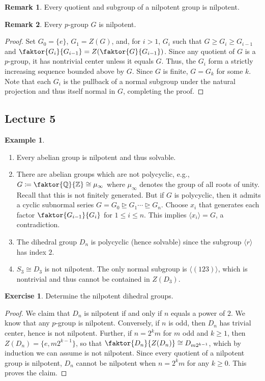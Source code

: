 \documentclass[10pt,letterpaper,cm]{nupset}
\theoremstyle{definition}
\newtheorem{exmp}{Example}
\newtheorem{remark}{Remark}
\newtheorem{exercise}{Exercise}
\newcommand{\Q}{\mathbb Q}
\newcommand{\Z}{\mathbb Z}
\newcommand{\1}{\mathbf{1}}
\newcommand{\0}{\vec 0}
\begin{document}
\begin{remark}
Every quotient and subgroup of a nilpotent group is nilpotent. 
\end{remark}

\begin{remark}
Every $p$-group $G$ is nilpotent. 
\end{remark}
\begin{proof}
Set $G_0 = \{e\}$, $G_1 = Z(G)$, and, for $i>1$, $G_{i}$ such that $G \geq G_i \geq G_{i-1}$ and $\faktor{G_i}{G_{i-1}} = Z(\faktor{G}{G_{i-1}})$. Since any quotient of $G$ is a $p$-group, it has nontrivial center unless it equals $G$.  Thus, the $G_i$ form a strictly increasing sequence bounded above by $G$. Since $G$ is finite, $G = G_k$ for some $k$. Note that each $G_i$ is the pullback of a normal subgroup under the natural projection and thus itself normal in $G$, completing the proof.
\end{proof}

\subsection{Lecture 5}

\begin{exmp}  $ $
\begin{enumerate}
\item Every abelian group is nilpotent and thus solvable. 
\item There are abelian groups which are not polycyclic, e.g., $G\coloneqq \faktor{\Q}{\Z} \cong \mu_{\infty}$ where $\mu_{\infty}$ denotes the group of all roots of unity. Recall that this is  not finitely generated.  But if $G$ is polycyclic, then it admits a cyclic subnormal series $G = G_0 \unrhd G_1 \cdots \unrhd G_n$. Choose $x_i$ that generates each factor $\faktor{G_{i-1}}{G_i}$ for $1\leq i \leq n$.  This implies $\langle x_i\rangle = G$, a contradiction. 
\item The dihedral group $D_n$ is polycyclic (hence solvable) since the subgroup $\langle r\rangle$ has index $2$.
\item $S_3\cong D_3$ is not nilpotent. The only normal subgroup is $\langle (1 2 3)\rangle$, which is nontrivial and thus cannot be contained in $Z(D_3)$.
\end{enumerate}
\end{exmp}

\begin{exercise}
Determine the nilpotent dihedral groups. 
\end{exercise}
\begin{proof}
We claim that $D_n$ is nilpotent  if and only if $n$ equals a power of $2$. We know that any $p$-group is nilpotent. Conversely, if $n$ is odd, then $D_n$ has trivial center, hence is not nilpotent. Further, if $n= 2^km$ for $m$ odd and $k\geq 1$, then $Z(D_n) = \{e, m2^{k-1}\}$, so that $\faktor{D_n}{Z(D_n)} \cong D_{m2^{k-1}}$, which by induction we can assume is not nilpotent. Since every quotient of a nilpotent group is nilpotent, $D_n$ cannot be nilpotent when $n = 2^km$ for any $k\geq 0$. This proves the claim.
\end{proof}
\end{document}

